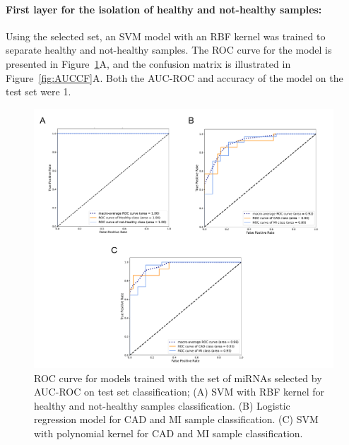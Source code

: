 \documentclass[sn-mathphys,Numbered]{sn-jnl}%
\theoremstyle{thmstyleone}%
\theoremstyle{thmstyletwo}%
\theoremstyle{thmstylethree}%
\begin{document}
\paragraph{First layer for the isolation of healthy and not-healthy
samples:}\label{first-layer-for-the-isolation-of-healthy-and-not-healthy-samples-3}

Using the selected set, an SVM model with an RBF kernel was trained to
separate healthy and not-healthy samples. The ROC curve for the model is
presented in Figure~\ref{fig:AUCROC}A, and the confusion matrix is
illustrated in Figure~\ref{fig:AUCCF}A. Both the AUC-ROC and accuracy of
the model on the test set were 1.

\begin{figure}
\centering 
\includegraphics[width=0.95\linewidth]{AUC best model ROCs}
\caption{ROC curve for models trained with the set of miRNAs selected by AUC-ROC on test set classification; (A) SVM with RBF kernel for healthy and not-healthy samples classification. (B) Logistic regression model for CAD and MI sample classification. (C) SVM with polynomial kernel for CAD and MI sample classification. }\label{fig:AUCROC}
\end{figure}
\end{document}
